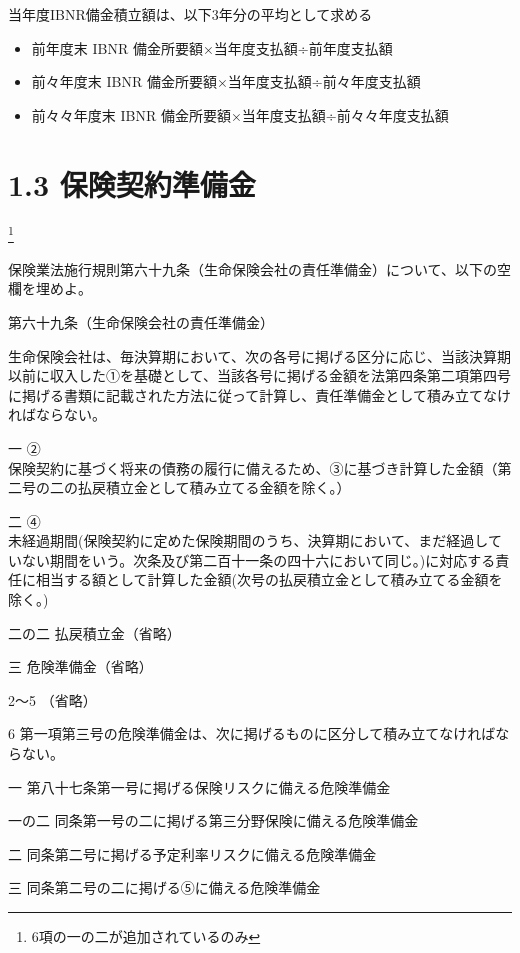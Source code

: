 \documentclass[report,gutter=10mm,fore-edge=10mm,uplatex,dvipdfmx]{jlreq}
\begin{document}
当年度IBNR備金積立額は、以下3年分の平均として求める

\begin{itemize}
\tightlist
\item
  前年度末 IBNR 備金所要額×当年度支払額÷前年度支払額
\item
  前々年度末 IBNR 備金所要額×当年度支払額÷前々年度支払額
\item
  前々々年度末 IBNR 備金所要額×当年度支払額÷前々々年度支払額
\end{itemize}

\section{1.3 保険契約準備金}

\footnote{6項の一の二が追加されているのみ}

保険業法施行規則第六十九条（生命保険会社の責任準備金）について、以下の空欄を埋めよ。

第六十九条（生命保険会社の責任準備金）

生命保険会社は、毎決算期において、次の各号に掲げる区分に応じ、当該決算期以前に収入した①を基礎として、当該各号に掲げる金額を法第四条第二項第四号に掲げる書類に記載された方法に従って計算し、責任準備金として積み立てなければならない。

一 ②\\
保険契約に基づく将来の債務の履行に備えるため、③に基づき計算した金額（第二号の二の払戻積立金として積み立てる金額を除く。）

二 ④\\
未経過期間(保険契約に定めた保険期間のうち、決算期において、まだ経過していない期間をいう。次条及び第二百十一条の四十六において同じ。)に対応する責任に相当する額として計算した金額(次号の払戻積立金として積み立てる金額を除く。)

二の二 払戻積立金（省略） 

三 危険準備金（省略） 

2～5 （省略） 

6 第一項第三号の危険準備金は、次に掲げるものに区分して積み立てなければならない。

一  第八十七条第一号に掲げる保険リスクに備える危険準備金 

一の二 同条第一号の二に掲げる第三分野保険に備える危険準備金 

二 同条第二号に掲げる予定利率リスクに備える危険準備金 

三 同条第二号の二に掲げる⑤に備える危険準備金 
\end{document}

